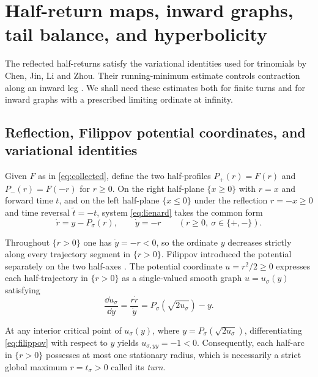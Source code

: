 \section{Half-return maps, inward graphs, tail balance, and hyperbolicity}\label{sec:toolkit}


The reflected half-returns satisfy the variational identities used
for trinomials by Chen, Jin, Li and Zhou. Their running-minimum
estimate controls contraction along an inward leg
\cite[Proposition~2.2, (3.5)--(3.7) and (3.17)--(3.19)]{CJLZ}.
We shall need these estimates both for finite turns and for inward
graphs with a prescribed limiting ordinate at infinity.


\subsection{Reflection, Filippov potential coordinates, and variational identities}\label{subsec:half-returns}
Given $F$ as in \eqref{eq:collected}, define the two half-profiles $P_+(r)=F(r)$ and $P_-(r)=F(-r)$
for $r\ge 0$. On the right half-plane $\{x\ge 0\}$ with $r=x$ and forward time $t$, and on the left
half-plane $\{x\le 0\}$ under the reflection $r=-x\ge 0$ and time reversal $\tilde{t}=-t$, system
\eqref{eq:lienard} takes the common form
\begin{equation}\label{eq:half-system}
  \dot{r} = y - P_\sigma(r), \qquad \dot{y} = -r \qquad (r\ge 0,\ \sigma\in\{+,-\}).
\end{equation}

Throughout $\{r>0\}$ one has $\dot{y}=-r<0$, so the ordinate $y$ decreases strictly along every
trajectory segment in $\{r>0\}$. Filippov introduced the potential separately on the two half-axes
\cite[pp.~171--172, (2)--(6)]{Filippov}. 
The potential coordinate $u=r^2/2\ge 0$
expresses each half-trajectory in $\{r>0\}$ as a single-valued smooth graph $u=u_\sigma(y)$ satisfying
\begin{equation}\label{eq:filippov}
  \frac{\dd u_\sigma}{\dd y} = \frac{r\dot{r}}{\dot{y}} = P_\sigma(\sqrt{2u_\sigma}) - y.
\end{equation}

At any interior critical point of $u_\sigma(y)$, where $y=P_\sigma(\sqrt{2u_\sigma})$, differentiating
\eqref{eq:filippov} with respect to $y$ yields $u_{\sigma,yy}=-1<0$. Consequently, each half-arc in
$\{r>0\}$ possesses at most one stationary radius, which is necessarily a strict global maximum
$r=t_\sigma>0$ called its \emph{turn}.


